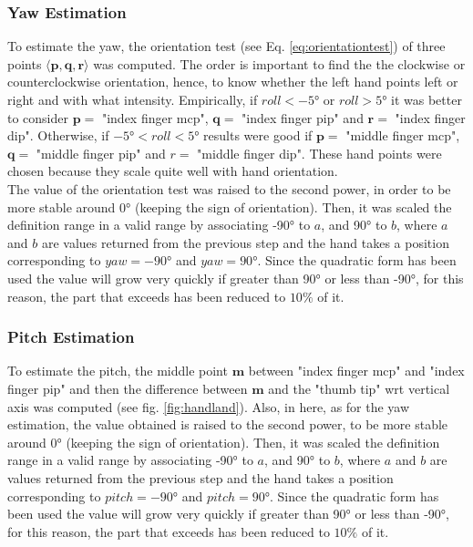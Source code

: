\subsubsection{Yaw Estimation}
\label{subsec:yaw}
To estimate the yaw, the orientation test (see Eq. \ref{eq:orientationtest}) of three points $\langle \bm{p}, \bm{q}, \bm{r} \rangle$ was computed. The order is important to find the the clockwise or counterclockwise orientation, hence, to know whether the left hand points left or right and with what intensity. Empirically, if $roll < \ang{-5}$ or $roll > \ang{+5}$ it was better to consider $\bm{p}=$ "index finger mcp", $\bm{q}=$ "index finger pip" and $\bm{r}=$ "index finger dip". Otherwise, if $\ang{-5} < roll < \ang{+5}$ results were good if $\bm{p}=$ "middle finger mcp", $\bm{q}=$ "middle finger pip" and $r=$ "middle finger dip". These hand points were chosen because they scale quite well with hand orientation. \\

\noindent The value of the orientation test was raised to the second power, in order to be more stable around \ang{0} (keeping the sign of orientation). Then, it was scaled the definition range in a valid range by associating \ang{-90} to $a$, and \ang{+90} to $b$, where $a$ and $b$ are values returned from the previous step and the hand takes a position corresponding to $yaw=\ang{-90}$ and $yaw=\ang{+90}$. Since the quadratic form has been used the value will grow very quickly if greater than \ang{+90} or less than \ang{-90}, for this reason, the part that exceeds has been reduced to $10\%$ of it. \\

\subsubsection{Pitch Estimation}
\label{subsec:pitch}
To estimate the pitch, the middle point $\bm{m}$ between "index finger mcp" and "index finger pip" and then the difference between $\bm{m}$ and the "thumb tip" \gls{wrt} vertical axis was computed (see fig. \ref{fig:handland}). Also, in here, as for the yaw estimation, the value obtained is raised to the second power, to be more stable around \ang{0} (keeping the sign of orientation). Then, it was scaled the definition range in a valid range by associating \ang{-90} to $a$, and \ang{+90} to $b$, where $a$ and $b$ are values returned from the previous step and the hand takes a position corresponding to $pitch=\ang{-90}$ and $pitch=\ang{+90}$. Since the quadratic form has been used the value will grow very quickly if greater than \ang{+90} or less than \ang{-90}, for this reason, the part that exceeds has been reduced to $10\%$ of it. \\

